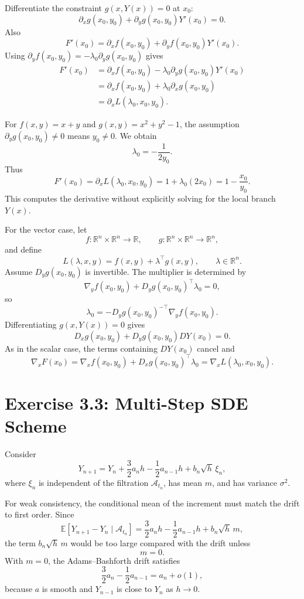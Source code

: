 \documentclass[11pt]{article}
\newcommand{\R}{\mathbb{R}}
\newcommand{\E}{\mathbb{E}}
\begin{document}
Differentiate the constraint $g(x,Y(x))=0$ at $x_0$:
\[
    \partial_x g(x_0,y_0)+\partial_y g(x_0,y_0)Y'(x_0)=0.
\]
Also
\[
    F'(x_0)=\partial_x f(x_0,y_0)+\partial_y f(x_0,y_0)Y'(x_0).
\]
Using $\partial_y f(x_0,y_0)=-\lambda_0\partial_y g(x_0,y_0)$ gives
\[
\begin{aligned}
F'(x_0)
&=\partial_x f(x_0,y_0)
  -\lambda_0\partial_y g(x_0,y_0)Y'(x_0)\\
&=\partial_x f(x_0,y_0)+\lambda_0\partial_x g(x_0,y_0)\\
&=\partial_x L(\lambda_0,x_0,y_0).
\end{aligned}
\]

For $f(x,y)=x+y$ and $g(x,y)=x^2+y^2-1$, the assumption
$\partial_y g(x_0,y_0)\ne0$ means $y_0\ne0$. We obtain
\[
    \lambda_0=-\frac{1}{2y_0}.
\]
Thus
\[
    F'(x_0)
    =\partial_x L(\lambda_0,x_0,y_0)
    =1+\lambda_0(2x_0)
    =1-\frac{x_0}{y_0}.
\]
This computes the derivative without explicitly solving for the local branch
$Y(x)$.

For the vector case, let
\[
    f:\R^n\times\R^n\to\R,\qquad
    g:\R^n\times\R^n\to\R^n,
\]
and define
\[
    L(\lambda,x,y)=f(x,y)+\lambda^\top g(x,y),
    \qquad \lambda\in\R^n.
\]
Assume $D_y g(x_0,y_0)$ is invertible. The multiplier is determined by
\[
    \nabla_y f(x_0,y_0)+D_y g(x_0,y_0)^\top\lambda_0=0,
\]
so
\[
    \lambda_0=-D_y g(x_0,y_0)^{-\top}\nabla_y f(x_0,y_0).
\]
Differentiating $g(x,Y(x))=0$ gives
\[
    D_x g(x_0,y_0)+D_y g(x_0,y_0)DY(x_0)=0.
\]
As in the scalar case, the terms containing $DY(x_0)$ cancel and
\[
    \nabla_x F(x_0)
    =
    \nabla_x f(x_0,y_0)+D_x g(x_0,y_0)^\top\lambda_0
    =
    \nabla_x L(\lambda_0,x_0,y_0).
\]

\section*{Exercise 3.3: Multi-Step SDE Scheme}

Consider
\[
    Y_{n+1}
    =
    Y_n+\frac32 a_nh-\frac12 a_{n-1}h+b_n\sqrt h\,\xi_n,
\]
where $\xi_n$ is independent of the filtration $\mathcal A_{t_n}$, has mean
$m$, and has variance $\sigma^2$.

For weak consistency, the conditional mean of the increment must match the drift
to first order. Since
\[
    \E[Y_{n+1}-Y_n\mid\mathcal A_{t_n}]
    =
    \frac32 a_nh-\frac12 a_{n-1}h+b_n\sqrt h\,m,
\]
the term $b_n\sqrt h\,m$ would be too large compared with the drift unless
\[
    m=0.
\]
With $m=0$, the Adams--Bashforth drift satisfies
\[
    \frac32 a_n-\frac12 a_{n-1}=a_n+o(1),
\]
because $a$ is smooth and $Y_{n-1}$ is close to $Y_n$ as $h\to0$.
\end{document}

